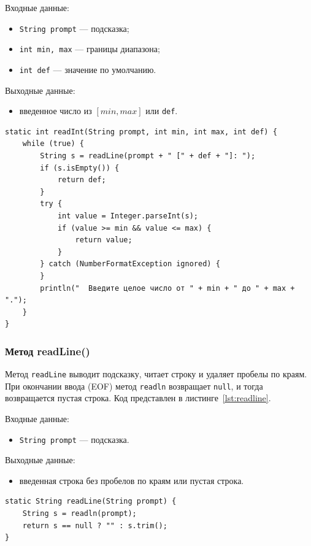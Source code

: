 Входные данные:
\begin{itemize}
	\item \texttt{String prompt} --- подсказка;
	\item \texttt{int min, max} --- границы диапазона;
	\item \texttt{int def} --- значение по умолчанию.
\end{itemize}

Выходные данные:
\begin{itemize}
	\item введенное число из $[min, max]$ или \texttt{def}.
\end{itemize}

\begin{lstlisting}[caption={Метод readInt()}, label={lst:readint}]
static int readInt(String prompt, int min, int max, int def) {
	while (true) {
		String s = readLine(prompt + " [" + def + "]: ");
		if (s.isEmpty()) {
			return def;
		}
		try {
			int value = Integer.parseInt(s);
			if (value >= min && value <= max) {
				return value;
			}
		} catch (NumberFormatException ignored) {
		}
		println("  Введите целое число от " + min + " до " + max + ".");
	}
}
\end{lstlisting}

\subsubsection*{Метод readLine()}

Метод \texttt{readLine} выводит подсказку, читает строку и удаляет пробелы по краям. При окончании ввода (EOF) метод \texttt{readln} возвращает \texttt{null}, и тогда возвращается пустая строка. Код представлен в листинге~\ref{lst:readline}.

Входные данные:
\begin{itemize}
	\item \texttt{String prompt} --- подсказка.
\end{itemize}

Выходные данные:
\begin{itemize}
	\item введенная строка без пробелов по краям или пустая строка.
\end{itemize}

\begin{lstlisting}[caption={Метод readLine()}, label={lst:readline}]
static String readLine(String prompt) {
	String s = readln(prompt);
	return s == null ? "" : s.trim();
}
\end{lstlisting}

